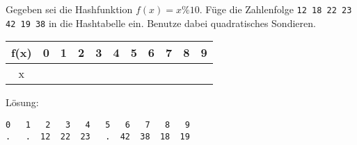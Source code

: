 
\renewcommand{\arraystretch}{2.0}
\setlength{\tabcolsep}{14pt}
\question[3]
Gegeben sei die Hashfunktion $f(x) = x \% 10$.
Füge die Zahlenfolge
\texttt{12 18 22 23 42 19 38}  in die Hashtabelle ein.
Benutze dabei quadratisches Sondieren.

\begin{tabular}{|c|c|c|c|c|c|c|c|c|c|c|}
\hline f(x) & 0 & 1 & 2 & 3 & 4 & 5 & 6 & 7 & 8 & 9 \\
\hline x     &   &    &    &   &   &    &    &   &   & \\
\hline
\end{tabular}

\ifprintanswers
Lösung:
\begin{lstlisting}
0   1   2   3   4   5   6   7   8   9
.   .  12  22  23   .  42  38  18  19
\end{lstlisting}
\fi
